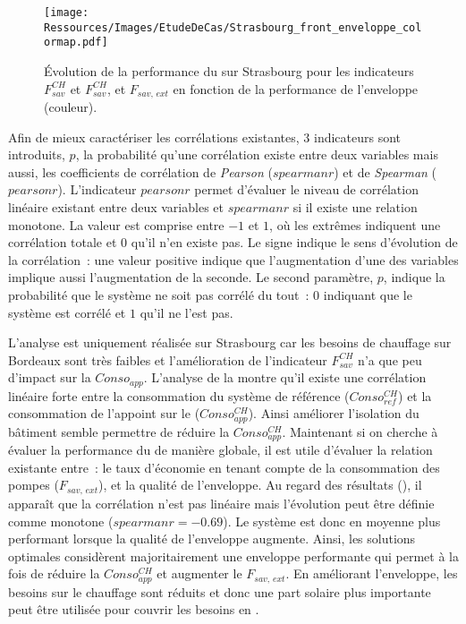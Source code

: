 \begin{figure}
    \centering
    \texttt{[image: Ressources/Images/EtudeDeCas/Strasbourg\_front\_enveloppe\_colormap.pdf]}
    \caption[Évolution de la performance du  en fonction de la qualité de l’enveloppe]
             {Évolution de la performance du  sur Strasbourg pour les indicateurs $F_{sav}^{CH}$
              et $F_{sav}^{CH}$, et $F_{sav,\,ext}$ en fonction de la performance de l’enveloppe (couleur).}
    \label{fig:pareto_enveloppe_strasbourg}
\end{figure}


Afin de mieux caractériser les corrélations existantes, $3$ indicateurs sont introduits,
$p$, la probabilité qu’une corrélation existe entre deux variables mais aussi, les
coefficients de corrélation de \textit{Pearson} ($spearmanr$) et de \textit{Spearman}
($pearsonr$). L’indicateur $pearsonr$ permet d’évaluer le niveau de corrélation linéaire
existant entre deux variables et $spearmanr$ si il existe une relation monotone. La valeur
est comprise entre $-1$ et $1$, où les extrêmes indiquent une corrélation totale et $0$
qu’il n’en existe pas. Le signe indique le sens d’évolution de la corrélation~: une
valeur positive indique que l’augmentation d’une des variables implique aussi
l’augmentation de la seconde. Le second paramètre, $p$, indique la probabilité que le
système ne soit pas corrélé du tout~: $0$ indiquant que le système est corrélé et $1$ qu’il
ne l’est pas.

L’analyse est uniquement réalisée sur Strasbourg car les besoins de chauffage sur Bordeaux
sont très faibles et l’amélioration de l’indicateur $F_{sav}^{CH}$ n’a que peu d’impact sur
la $Conso_{app}$. L’analyse de la  montre qu’il existe une
corrélation linéaire forte entre la
consommation du système de référence ($Conso_{ref}^{CH}$) et la consommation de l’appoint sur
le  ($Conso_{app}^{CH}$). Ainsi améliorer l’isolation du bâtiment semble permettre
de réduire la $Conso_{app}^{CH}$. Maintenant si on cherche à évaluer la performance du
 de manière globale, il est utile d’évaluer la relation existante entre~:
le taux d’économie en tenant compte de la consommation des pompes ($F_{sav,\,ext}$), et
la qualité de l’enveloppe. Au regard des résultats (),
il apparaît que la corrélation n’est pas linéaire mais l’évolution peut être définie
comme monotone ($spearmanr = \num{-0.69}$). Le système est donc en moyenne plus performant
lorsque la qualité de l’enveloppe augmente. Ainsi, les solutions optimales
considèrent majoritairement une enveloppe performante qui permet à la fois de réduire
la $Conso_{app}^{CH}$ et augmenter le $F_{sav,\,ext}$. En améliorant l’enveloppe, les besoins
sur le chauffage sont réduits et donc une part solaire plus importante peut être
utilisée pour couvrir les besoins en .

